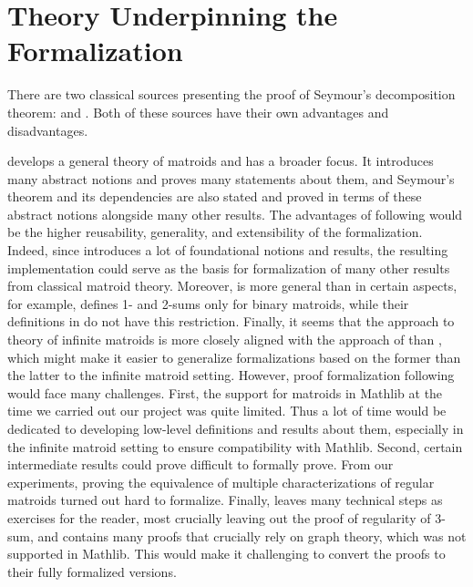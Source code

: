 \section{Theory Underpinning the Formalization}

There are two classical sources presenting the proof of Seymour's decomposition theorem: \cite{Oxley2011} and \cite{Truemper2016}. Both of these sources have their own advantages and disadvantages.

\citeauthor{Oxley2011} \cite{Oxley2011} develops a general theory of matroids and has a broader focus. It introduces many abstract notions and proves many statements about them, and Seymour's theorem and its dependencies are also stated and proved in terms of these abstract notions alongside many other results. The advantages of following \cite{Oxley2011} would be the higher reusability, generality, and extensibility of the formalization. Indeed, since \cite{Oxley2011} introduces a lot of foundational notions and results, the resulting implementation could serve as the basis for formalization of many other results from classical matroid theory. Moreover, \cite{Oxley2011} is more general than \cite{Truemper2016} in certain aspects, for example, \cite{Truemper2016} defines 1- and 2-sums only for binary matroids, while their definitions in \cite{Oxley2011} do not have this restriction. Finally, it seems that the approach to theory of infinite matroids \cite{Bruhn2013} is more closely aligned with the approach of \cite{Oxley2011} than \cite{Truemper2016}, which might make it easier to generalize formalizations based on the former than the latter to the infinite matroid setting. However, proof formalization following \cite{Oxley2011} would face many challenges. First, the support for matroids in Mathlib at the time we carried out our project was quite limited. Thus a lot of time would be dedicated to developing low-level definitions and results about them, especially in the infinite matroid setting to ensure compatibility with Mathlib. Second, certain intermediate results could prove difficult to formally prove. From our experiments, proving the equivalence of multiple characterizations of regular matroids turned out hard to formalize. Finally, \cite{Oxley2011} leaves many technical steps as exercises for the reader, most crucially leaving out the proof of regularity of 3-sum, and contains many proofs that crucially rely on graph theory, which was not supported in Mathlib. This would make it challenging to convert the proofs to their fully formalized versions.

